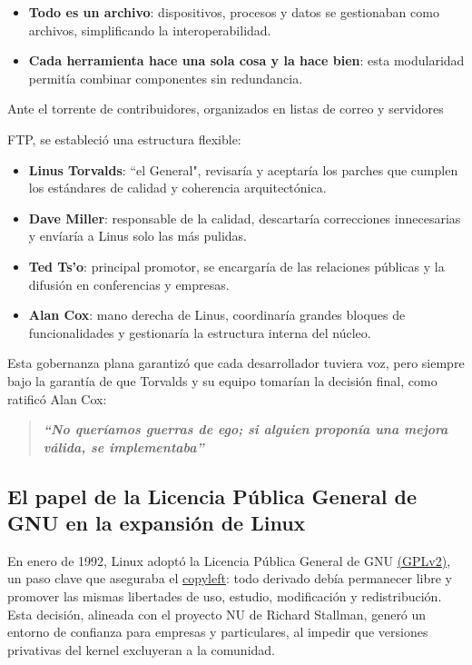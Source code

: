 \documentclass[a4paper,12pt]{article}
\begin{document}
\begin{itemize}[label=$\bullet$, itemsep=0.5em]
    \item \textbf{Todo es un archivo}: dispositivos, procesos y datos se
    gestionaban como archivos, simplificando la interoperabilidad.     
    \item \textbf{Cada herramienta hace una sola cosa y la hace bien}:
    esta modularidad permitía combinar componentes sin redundancia.
\end{itemize}

Ante el torrente de contribuidores, organizados en listas de correo y servidores

FTP, se estableció una estructura flexible:
\begin{itemize}[label=$\bullet$, itemsep=0.5em]
    \item \textbf{Linus Torvalds}: ``el General", revisaría y aceptaría los parches que
    cumplen los estándares de calidad y coherencia arquitectónica. 
    \item \textbf{Dave Miller}: responsable de la calidad, descartaría correcciones
    innecesarias y envíaría a Linus solo las más pulidas.  
    \item \textbf{Ted Ts’o}: principal promotor, se encargaría de las relaciones
    públicas y la difusión en conferencias y empresas.  
    \item \textbf{Alan Cox}: mano derecha de Linus, coordinaría grandes bloques de
    funcionalidades y gestionaría la estructura interna del núcleo.
\end{itemize} 

Esta gobernanza plana garantizó que cada desarrollador tuviera voz, pero siempre
bajo la garantía de que Torvalds y su equipo tomarían la decisión final, como
ratificó Alan Cox:

\begin{quote}
    \textbf{\textit{“No queríamos guerras de ego; si alguien proponía una mejora válida, se
    implementaba”}} 
\end{quote}
\newpage

\subsection{El papel de la Licencia Pública General de GNU en la expansión de Linux}

En enero de 1992, Linux adoptó la Licencia Pública General de GNU \hyperlink{gpl}{(GPLv2)}, un
paso clave que aseguraba el \hyperlink{copyleft}{copyleft}: todo derivado debía permanecer libre y
promover las mismas libertades de uso, estudio, modificación y redistribución. 
Esta decisión, alineada con el proyecto NU de Richard Stallman, generó un
entorno de confianza para empresas y particulares, al impedir que versiones
privativas del kernel excluyeran a la comunidad.
\end{document}
